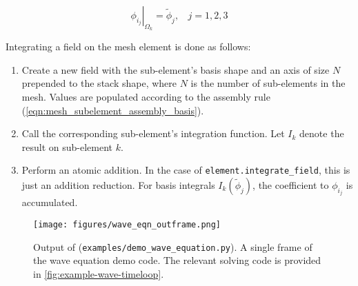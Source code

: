 \begin{equation}
    \left.\phi_{i_j}\right|_{\Omega_k} = \tilde\phi_j,~~~~j=1,2,3
    \label{eqn:mesh_subelement_assembly_basis}
\end{equation}

Integrating a field on the mesh element is done as follows:
\begin{enumerate}
\item Create a new field with the sub-element's basis shape and an axis of size $N$ prepended to the stack shape, where $N$ is the number of sub-elements in the mesh. Values are populated according to the assembly rule (\ref{eqn:mesh_subelement_assembly_basis}).
\item Call the corresponding sub-element's integration function. Let $I_k$ denote the result on sub-element $k$.
\item Perform an atomic addition. In the case of \verb+element.integrate_field+, this is just an addition reduction. For basis integrals $I_k(\tilde\phi_j)$, the coefficient to $\phi_{i_j}$ is accumulated.
\end{enumerate}


\begin{figure}[H]
    \centering
    \texttt{[image: figures/wave\_eqn\_outframe.png]}
    \caption{Output of (\texttt{examples/demo\_wave\_equation.py}). A single frame of the wave equation demo code. The relevant solving code is provided in \autoref{fig:example-wave-timeloop}.}
    \label{fig:wave-eqn-frame}
\end{figure}
